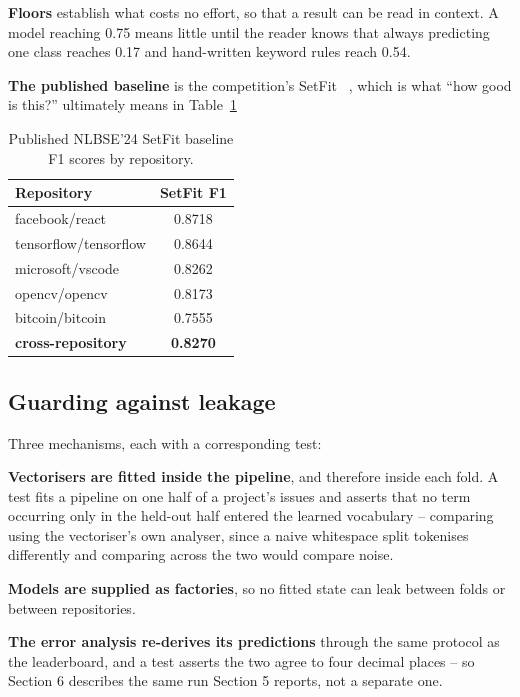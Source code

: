 \textbf{Floors} establish what costs no effort, so that a result can be read in context. A model reaching 0.75 means little until the reader knows that always predicting one class reaches 0.17 and hand-written keyword rules reach 0.54.

\textbf{The published baseline} is the competition's SetFit ~\cite{nlbse2024}, which is what ``how good is this?'' ultimately means in Table~\ref{tab:published_baseline_scores}

\begin{table}[h]
\centering
\caption{Published NLBSE'24 SetFit baseline F1 scores by repository.}
\label{tab:published_baseline_scores}
\vspace{0.5em}
\begin{tabular}{l c}
\hline
Repository & SetFit F1 \\
\hline
facebook/react & 0.8718 \\
tensorflow/tensorflow & 0.8644 \\
microsoft/vscode & 0.8262 \\
opencv/opencv & 0.8173 \\
bitcoin/bitcoin & 0.7555 \\
\textbf{cross-repository} & \textbf{0.8270} \\
\hline
\end{tabular}
\end{table}

\subsection{Guarding against leakage}

Three mechanisms, each with a corresponding test:

\textbf{Vectorisers are fitted inside the pipeline}, and therefore inside each fold. A test fits a pipeline on one half of a project's issues and asserts that no term occurring only in the held-out half entered the learned vocabulary -- comparing using the vectoriser's own analyser, since a naive whitespace split tokenises differently and comparing across the two would compare noise.

\textbf{Models are supplied as factories}, so no fitted state can leak between folds or between repositories.

\textbf{The error analysis re-derives its predictions} through the same protocol as the leaderboard, and a test asserts the two agree to four decimal places -- so Section 6 describes the same run Section 5 reports, not a separate one.